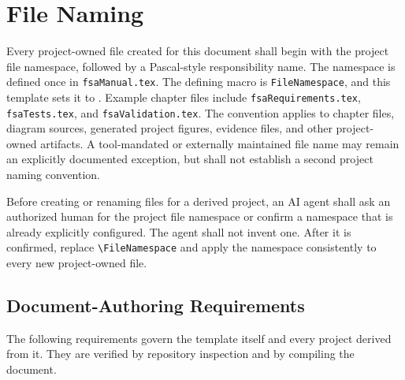 \section{File Naming}

Every project-owned file created for this document shall begin with the project
file namespace, followed by a Pascal-style responsibility name. The namespace
is defined once in \texttt{fsaManual.tex}. The defining macro is
\texttt{FileNamespace}, and this template sets it to
\texttt{\FileNamespace}. Example chapter files include
\texttt{fsaRequirements.tex}, \texttt{fsaTests.tex}, and
\texttt{fsaValidation.tex}. The convention applies to chapter files, diagram
sources, generated project figures, evidence files, and other project-owned
artifacts. A tool-mandated or externally maintained file name may remain an
explicitly documented exception, but shall not establish a second project
naming convention.

Before creating or renaming files for a derived project, an AI agent shall ask
an authorized human for the project file namespace or confirm a namespace that
is already explicitly configured. The agent shall not invent one. After it is
confirmed, replace \verb|\FileNamespace| and apply the namespace consistently
to every new project-owned file.

\subsection{Document-Authoring Requirements}
The following requirements govern the template itself and every project derived
from it. They are verified by repository inspection and by compiling the
document.

